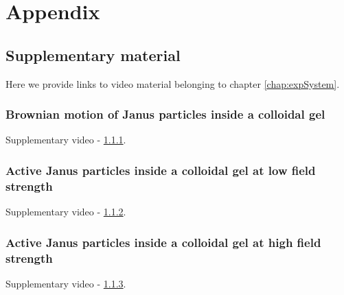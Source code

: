 %
%

\chapter{Appendix}
\label{app:app01}


\section{Supplementary material}

Here we provide links to video material belonging to chapter \ref{chap:expSystem}.

\subsection{Brownian motion of Janus particles inside a colloidal gel}
\label{app:brownian}
Supplementary video - \href{https://www.dropbox.com/s/n2jzuvl337omt29/passive.avi?dl=0}{\ref{app:brownian}}.

\subsection{Active Janus particles inside a colloidal gel at low field strength}
\label{app:activejanus}
Supplementary video - \href{https://www.dropbox.com/s/9wzuu48jgq4nlrf/active2.avi?dl=0}{\ref{app:activejanus}}.

\subsection{Active Janus particles inside a colloidal gel at high field strength}
\label{app:janusHydrodynamics}
Supplementary video - \href{https://www.dropbox.com/s/zc7d15mu0g4rlo7/active3.avi?dl=0}{\ref{app:janusHydrodynamics}}.
